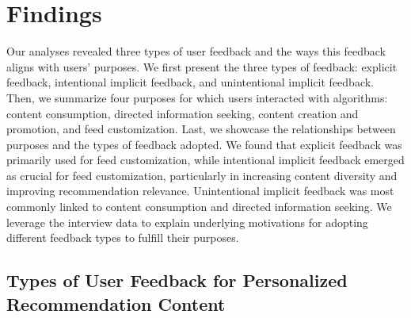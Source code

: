 \section{Findings} 
Our analyses revealed three types of user feedback and the ways this feedback aligns with users' purposes. We first present the three types of feedback: explicit feedback, intentional implicit feedback, and unintentional implicit feedback. 
Then, we summarize four purposes for which users interacted with algorithms: content consumption, directed information seeking, content creation and promotion, and feed customization. Last, we showcase the relationships between purposes and the types of feedback adopted. We found that explicit feedback was primarily used for feed customization, while intentional implicit feedback emerged as crucial for feed customization, particularly in increasing content diversity and improving recommendation relevance. Unintentional implicit feedback was most commonly linked to content consumption and directed information seeking. We leverage the interview data to explain underlying motivations for adopting different feedback types to fulfill their purposes.

\subsection{Types of User Feedback for Personalized Recommendation Content}


